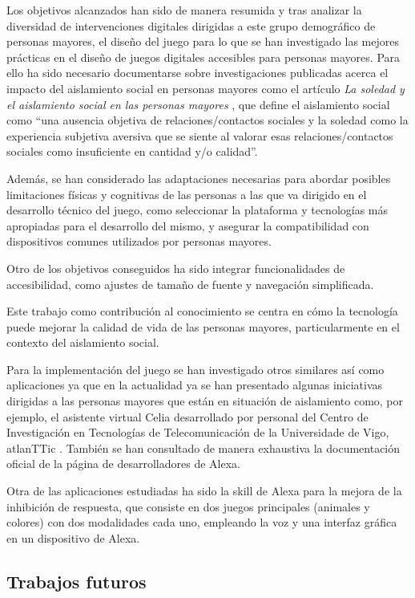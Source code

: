 Los objetivos alcanzados han sido de manera resumida y tras analizar la diversidad de intervenciones digitales dirigidas a este grupo demográfico de personas mayores, el diseño del juego para lo que se han investigado las mejores prácticas en el diseño de juegos digitales accesibles para personas mayores. Para ello ha sido necesario documentarse sobre investigaciones publicadas acerca el impacto del aislamiento social en personas mayores como el artículo \textit{La soledad y el aislamiento social en las personas mayores} \parencite{ArruebarrenaCabaco2020}, que define el aislamiento social como \enquote{una ausencia objetiva de relaciones/contactos sociales y la soledad como la experiencia subjetiva aversiva que se siente al valorar esas relaciones/contactos sociales como insuficiente en cantidad y/o calidad}.

Además, se han considerado las adaptaciones necesarias para abordar posibles limitaciones físicas y cognitivas de las personas a las que va dirigido en el desarrollo técnico del juego, como seleccionar la plataforma y tecnologías más apropiadas para el desarrollo del mismo, y asegurar la compatibilidad con dispositivos comunes utilizados por personas mayores.

Otro de los objetivos conseguidos ha sido integrar funcionalidades de accesibilidad, como ajustes de tamaño de fuente y navegación simplificada.

Este trabajo como contribución al conocimiento se centra en cómo la tecnología puede mejorar la calidad de vida de las personas mayores, particularmente en el contexto del aislamiento social.

Para la implementación del juego se han investigado otros similares así como aplicaciones ya que en la actualidad ya se han presentado algunas iniciativas dirigidas a las personas mayores que están en situación de aislamiento como, por ejemplo, el asistente virtual Celia desarrollado por personal del Centro de Investigación en Tecnologías de Telecomunicación de la Universidade de Vigo, atlanTTic \parencite{celia-app}. También se han consultado de manera exhaustiva la documentación oficial de la página de desarrolladores de Alexa.

Otra de las aplicaciones estudiadas ha sido la skill de Alexa para la mejora de la inhibición de respuesta, que consiste en dos juegos principales (animales y colores) con dos modalidades cada uno, empleando la voz y una interfaz gráfica en un dispositivo de Alexa.

\subsection{Trabajos futuros}

